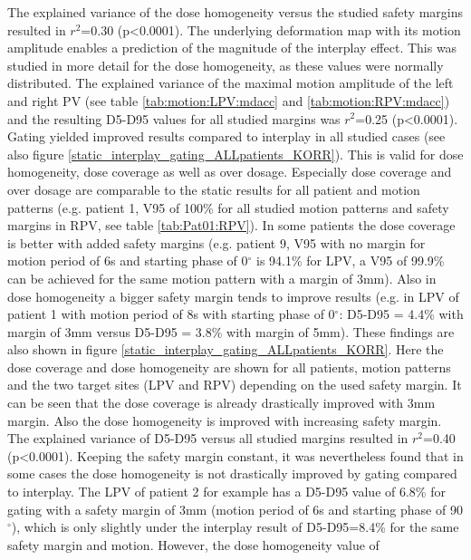 The explained variance of the dose homogeneity versus the studied safety margins resulted in $r^{2}$=0.30 (p<0.0001).\newline 
\newline
The underlying deformation map with its motion amplitude enables a prediction of the magnitude of the interplay effect. 
This was studied in more detail for the dose homogeneity, as these values were normally distributed. 
The explained variance of the maximal motion amplitude of the left and right PV (see table \ref{tab:motion:LPV:mdacc} and 
\ref{tab:motion:RPV:mdacc}) and the resulting D5-D95 values for all studied margins was $r^{2}$=0.25 (p<0.0001).\newline 
\newline
Gating yielded improved results compared to interplay in all studied cases (see also figure \ref{static_interplay_gating_ALLpatients_KORR}). 
This is valid for dose homogeneity, dose coverage as 
well as over dosage. Especially dose coverage and over dosage are comparable to the static results for all patient and motion patterns 
(e.g. patient 1, V95 of 100\% for all studied motion patterns and safety margins in RPV, see table \ref{tab:Pat01:RPV}). In some patients the 
dose coverage is better with added safety margins (e.g. patient 9, V95 with no margin for motion period of 6s and starting phase of 0$^{\circ}$ is 94.1\% for LPV, 
a V95 of 99.9\% can be achieved for the same motion pattern with a margin of 3mm). Also in dose homogeneity a bigger safety margin tends to 
improve results (e.g. in LPV of patient 1 with motion period of 8s with starting phase of 0$^{\circ}$: D5-D95 = 4.4\% with margin of 3mm 
versus D5-D95 = 3.8\% with margin of 5mm). These findings are also shown in figure \ref{static_interplay_gating_ALLpatients_KORR}. Here 
the dose coverage and dose homogeneity are shown for all patients, motion patterns and the two target sites (LPV and RPV) depending on the 
used safety margin. It can be seen that the dose coverage is already drastically improved with 3mm margin. Also the dose homogeneity is 
improved with increasing safety margin. 
The explained variance of D5-D95 versus all studied margins resulted in $r^{2}$=0.40 (p<0.0001). 
Keeping the safety margin constant, it was nevertheless found that in some cases 
the dose homogeneity is not drastically improved by gating compared to interplay. The LPV of patient 2 for example 
has a D5-D95 value of 6.8\% for gating with a safety margin of 3mm (motion period of 6s and starting phase of 90$^{\circ}$), which is 
only slightly under the interplay result of D5-D95=8.4\% for the same safety margin and motion. However, the dose homogeneity value of 
